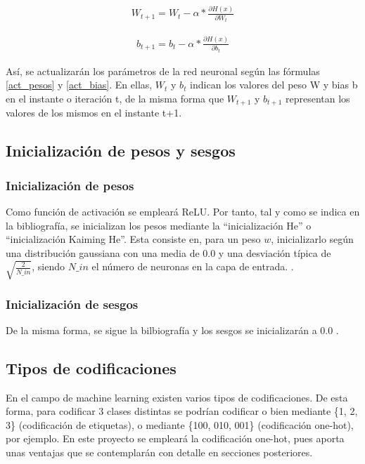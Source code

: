 \begin{gather}
	W_{t+1} = W_{t} - \alpha * \frac{\partial H(x)}{\partial W_{t}} 
	\label{act_pesos}
\end{gather}

\begin{gather}
	b_{t+1} = b_{t} - \alpha * \frac{\partial H(x)}{\partial b_{t}}
	\label{act_bias}
\end{gather}


Así, se actualizarán los parámetros de la red neuronal según las fórmulas \ref{act_pesos} y \ref{act_bias}. En ellas, $W_t$ y $b_t$ indican los valores del peso W y bias b en el instante o iteración t, de la misma forma que $W_{t+1}$ y $b_{t+1}$ representan los valores de los mismos en el instante t+1. \cite{SGD_act_params}

\subsection{Inicialización de pesos y sesgos}

\subsubsection{Inicialización de pesos}
Como función de activación se empleará ReLU. Por tanto, tal y como se indica en la bibliografía, se inicializan los pesos mediante la ``inicialización He'' o ``inicialización Kaiming He''. Esta consiste en, para un peso $w$, inicializarlo según una distribución gaussiana con una media de 0.0 y una desviación típica de $\sqrt{\frac{2}{N\_in}}$, siendo $N\_in$ el número de neuronas en la capa de entrada.
 \cite{ini_He} \cite{ini_He_2} \cite{ini_He_code}.

\subsubsection{Inicialización de sesgos}

De la misma forma, se sigue la bilbiografía y los sesgos se inicializarán a 0.0 . \cite{ini_bias} \cite{ini_bias_2}

\subsection{Tipos de codificaciones}

En el campo de machine learning existen varios tipos de codificaciones. De esta forma, para codificar 3 clases distintas se podrían codificar o bien mediante \{1, 2, 3\} (codificación de etiquetas), o mediante \{100, 010, 001\} (codificación one-hot), por ejemplo. En este proyecto se empleará la codificación one-hot, pues aporta unas ventajas que se contemplarán con detalle en secciones posteriores.

